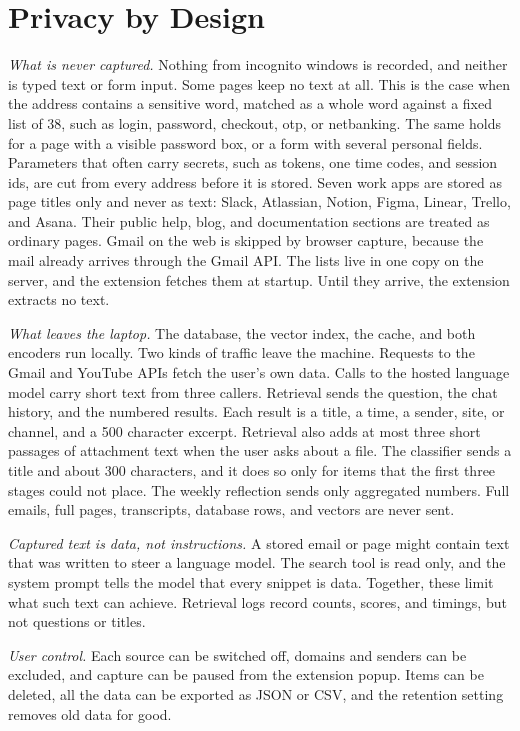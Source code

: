 \documentclass[conference]{IEEEtran}
\begin{document}
\section{Privacy by Design}\label{sec:privacy}
\textit{What is never captured.} Nothing from incognito windows is recorded, and neither is typed text or form input. Some pages keep no text at all. This is the case when the address contains a sensitive word, matched as a whole word against a fixed list of 38, such as login, password, checkout, otp, or netbanking. The same holds for a page with a visible password box, or a form with several personal fields. Parameters that often carry secrets, such as tokens, one time codes, and session ids, are cut from every address before it is stored. Seven work apps are stored as page titles only and never as text: Slack, Atlassian, Notion, Figma, Linear, Trello, and Asana. Their public help, blog, and documentation sections are treated as ordinary pages. Gmail on the web is skipped by browser capture, because the mail already arrives through the Gmail API. The lists live in one copy on the server, and the extension fetches them at startup. Until they arrive, the extension extracts no text.

\textit{What leaves the laptop.} The database, the vector index, the cache, and both encoders run locally. Two kinds of traffic leave the machine. Requests to the Gmail and YouTube APIs fetch the user's own data. Calls to the hosted language model carry short text from three callers. Retrieval sends the question, the chat history, and the numbered results. Each result is a title, a time, a sender, site, or channel, and a 500 character excerpt. Retrieval also adds at most three short passages of attachment text when the user asks about a file. The classifier sends a title and about 300 characters, and it does so only for items that the first three stages could not place. The weekly reflection sends only aggregated numbers. Full emails, full pages, transcripts, database rows, and vectors are never sent.

\textit{Captured text is data, not instructions.} A stored email or page might contain text that was written to steer a language model. The search tool is read only, and the system prompt tells the model that every snippet is data. Together, these limit what such text can achieve. Retrieval logs record counts, scores, and timings, but not questions or titles.

\textit{User control.} Each source can be switched off, domains and senders can be excluded, and capture can be paused from the extension popup. Items can be deleted, all the data can be exported as JSON or CSV, and the retention setting removes old data for good.
\end{document}
